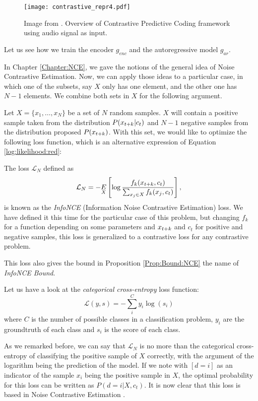 \begin{figure}[H]
    \centering 
    \texttt{[image: contrastive\_repr4.pdf]}
    \caption{Image from \citep{oord_representation_2019}. Overview of Contrastive Predictive Coding framework using audio signal as input. }
\end{figure}

Let us see how we train the encoder $g_{enc}$ and the autoregressive model $g_{ar}$.

In Chapter \ref{Chapter:NCE}, we gave the notions of the general idea of Noise Contrastive Estimation. Now, we can apply those ideas to a particular case, in which one of the subsets, say $X$ only has one element, and the other one has $N-1$ elements. We combine both sets in $X$ for the following argument.

Let $X = \{x_1,\dots,x_N\}$ be a set of $N$ random samples. $X$ will contain a positive sample taken from the distribution $P( x_{t+k} |c_t)$ and $N-1$ negative
samples from the distribution proposed $P(x_{t+k})$. With this set, we would like to optimize the following loss function, which is an alternative expression of Equation \eqref{log:likelihood:red}:
\begin{ndef}
The loss $\mathcal L_N$ defined as
\begin{equation}\label{NCE:loss}
\mathcal L_N = - \underset{X}{E} \left[\log \frac{f_k(x_{t+k},c_t)}{\sum_{x_j \in X} f_k(x_j,c_t)}\right],
\end{equation}
is known as the \emph{InfoNCE} (Information Noise Contrastive Estimation) loss. We have defined it this time for the particular case of this problem, but changing $f_k$ for a function depending on some parameters and $x_{t+k}$ and $c_t$ for positive and negative samples, this loss is generalized to a contrastive loss for any contrastive problem.

This loss also gives the bound in Proposition \ref{Prop:Bound:NCE} the name of \emph{InfoNCE Bound}.

\end{ndef}

Let us have a look at the \emph{categorical cross-entropy} loss function:
\[
    \mathcal L(y,s) = -\sum_i^C y_i \log(s_i)    
\]
where $C$ is the number of possible classes in a classification problem, $y_i$ are the groundtruth of each class and $s_i$ is the score of each class.

As we remarked before, we can say that $\mathcal L_N$ is no more than the categorical cross-entropy of classifying the positive sample of $X$ correctly, with the argument of the logarithm being the prediction
of the model. If we note with $[d = i]$ as an indicator of the sample $x_i$ being the positive sample in $X$, the optimal probability for this loss can be written as $P(d = i|X,c_t)$. It is now clear that this loss is based in Noise Contrastive Estimation \citep{gutmann_noise-contrastive_nodate}.

